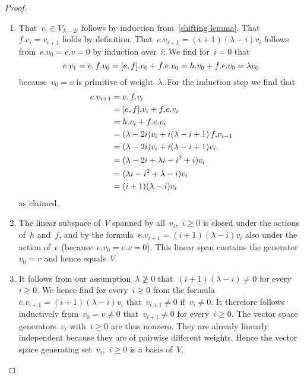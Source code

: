 \begin{proof}
  \leavevmode
  \begin{enumerate}
    \item
      That~$v_i \in V_{\lambda - 2i}$ follows by induction from~\cref{shifting lemma}.
      That~$f.v_i = v_{i+1}$ holds by definition.
      That~$e.v_{i+1} = (i+1)(\lambda-i) v_i$ follows from~$e.v_0 = e.v = 0$ by induction over~$i$:
      We find for~$i = 0$ that
      \[
        e.v_1
        =
        e . \, f . v_0
        =
        [e,f].v_0 + f.e.v_0
        =
        h.v_0 + f.e.v_0
        =
        \lambda v_0
      \]
      because~$v_0 = v$ is primitive of weight~$\lambda$.
      For the induction step we find that
      \begin{align*}
        e.v_{i+1}
        &=
        e . \, f . v_i
        \\
        &=
        [e,f].v_i + f.e.v_i
        \\
        &=
        h.v_i + f.e.v_i
        \\
        &=
        (\lambda - 2i)v_i + i (\lambda-i+1) \, f.v_{i-1}
        \\
        &=
        (\lambda - 2i)v_i + i (\lambda-i+1) v_i
        \\
        &=
        (\lambda - 2i + \lambda i - i^2 + i) v_i
        \\
        &=
        (\lambda i - i^2 + \lambda - i) v_i
        \\
        &=
        (i+1)(\lambda-i) v_i
      \end{align*}
      as claimed.
    \item
      The linear subspace of~$V$ spanned by all~$v_i$,~$i \geq 0$ is closed under the actions of~$h$ and~$f$, and by the formula~$e.v_{i+1} = (i+1)(\lambda-i) v_i$ also under the action of~$e$ (because~$e.v_0 = e.v = 0$).
      This linear span contains the generator~$v_0 = v$ and hence equals~$V$.
    \item
      It follows from our assumption~$\lambda \ngeq 0$ that~$(i+1)(\lambda-i) \neq 0$ for every~$i \geq 0$.
      We hence find for every~$i \geq 0$ from the formula~$e.v_{i+1} = (i+1)(\lambda-i) v_i$ that~$v_{i+1} \neq 0$ if~$v_i \neq 0$.
      It therefore follows inductively from~$v_0 = v \neq 0$ that~$v_{i+1} \neq 0$ for every~$i \geq 0$.
      The vector space generators~$v_i$ with~$i \geq 0$ are thus nonzero.
      They are already linearly independent because they are of pairwise different weights.
      Hence the vector space generating set~$v_i$,~$i \geq 0$ is a basis of~$V$.
      

\end{enumerate}
\end{proof}

